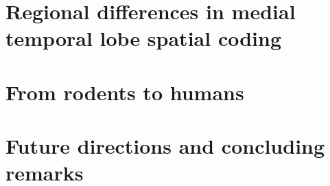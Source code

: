 
\section{Regional differences in medial temporal lobe spatial coding}



\section{From rodents to humans}

\section{Future directions and concluding remarks}












